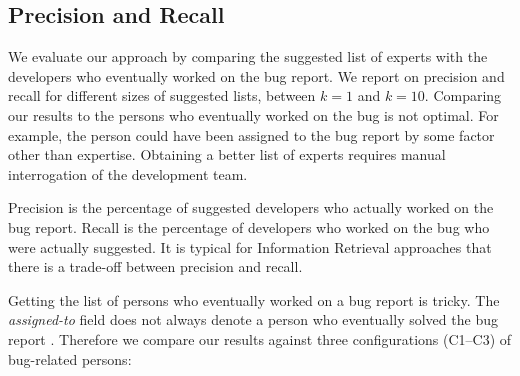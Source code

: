 \documentclass[10pt]{book}
\begin{document}


\subsection{Precision and Recall}

We evaluate our approach by comparing the suggested list of experts with the developers who eventually worked on the bug report. We report on precision and recall for different sizes of suggested lists, between $k = 1$ and $k = 10$. Comparing our results to the persons who eventually worked on the bug is not optimal. For example, the person could have been assigned to the bug report by some factor other than expertise. Obtaining a better list of experts requires manual interrogation of the development team.

Precision is the percentage of suggested developers who actually worked on the bug report. Recall is the percentage of developers who worked on the bug who were actually suggested. It is typical for Information Retrieval approaches that there is a trade-off between precision and recall.

Getting the list of persons who eventually worked on a bug report is tricky. The \emph{assigned-to} field does not always denote a person who eventually solved the bug report \cite{Cubr04b, Anvi06a, Anvik07}. Therefore we compare our results against three configurations (C1--C3) of bug-related persons:
\end{document}
